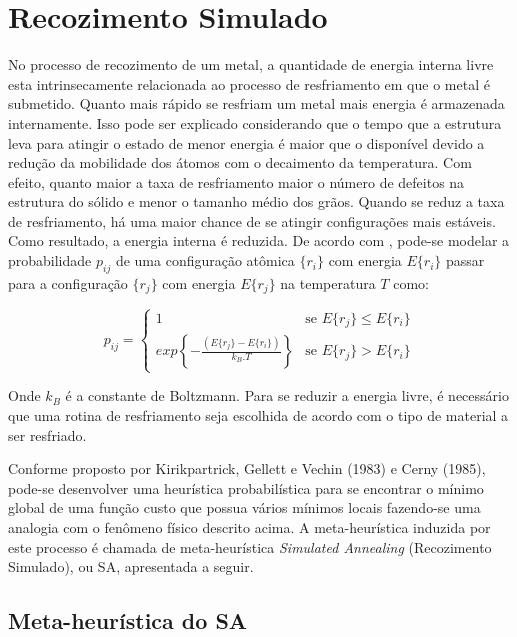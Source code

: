 \section{Recozimento Simulado}

No processo de recozimento de um metal, a quantidade de energia interna livre
esta intrinsecamente relacionada ao processo de resfriamento em que o metal é
submetido. Quanto mais rápido se resfriam um metal mais energia é armazenada
internamente. Isso pode ser explicado considerando que o tempo que a estrutura
leva para atingir o estado de menor energia é maior que o disponível devido
a redução da mobilidade dos átomos com o decaimento da temperatura. Com efeito,
quanto maior a taxa de resfriamento maior o número de defeitos na estrutura do
sólido e menor o tamanho médio dos grãos. Quando se reduz a taxa de resfriamento, 
há uma maior chance de se atingir configurações mais estáveis.
Como resultado, a energia interna é reduzida. De acordo com
\cite{bertsimas1993simulated}, pode-se modelar a probabilidade $p_{ij}$ de uma
configuração atômica $\{r_i\}$ com energia $E\{r_i\}$ passar para a configuração $\{r_j\}$ com energia $E\{r_j\}$ na temperatura $T$ como:

\begin{equation}
\mbox{$p_{ij}$}=\left\{
	\begin{array}{rl}
	1 & \mbox{se $E\{r_j\} \le E\{r_i\}$} \\
	exp\left\{-\frac{(E\{r_j\}-E\{r_i\})}{k_B.T}\right\} & \mbox{se $E\{r_j\} > E\{r_i\}$}
\end{array} \right.
\end{equation}

Onde $k_B$ é a constante de Boltzmann. Para se reduzir a energia livre, é necessário que uma
rotina de resfriamento seja escolhida de acordo com o tipo de material a ser resfriado.

Conforme proposto por Kirikpartrick, Gellett e Vechin (1983) e Cerny (1985), pode-se desenvolver
uma heurística probabilística para se encontrar o mínimo global de uma função custo que possua
vários mínimos locais fazendo-se uma analogia com o fenômeno físico descrito acima. A meta-heurística
induzida por este processo é chamada de meta-heurística \textit{Simulated Annealing} (Recozimento
Simulado), ou SA, apresentada a seguir.

\subsection{Meta-heurística do SA}

